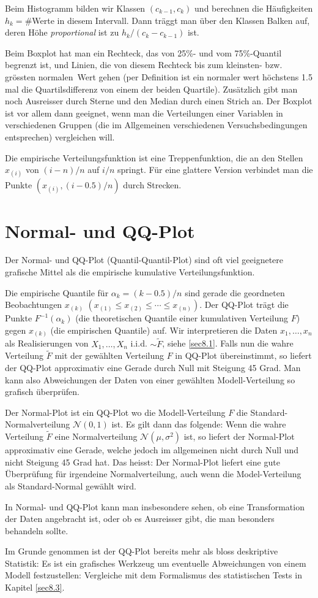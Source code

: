Beim Histogramm bilden wir Klassen $(c_{k-1},c_k)$ und berechnen die Häufigkeiten $h_k=$\#Werte in diesem Intervall. Dann träggt man über den Klassen Balken auf, deren Höhe \emph{proportional} ist zu $h_k/(c_k-c_{k-1})$ ist.

Beim Boxplot hat man ein Rechteck, das von 25\%- und vom 75\%-Quantil begrenzt ist, und Linien, die von diesem Rechteck bis zum kleinsten- bzw. grössten \glqq normalen\grqq\ Wert gehen (per Definition ist ein normaler wert höchstens 1.5 mal die Quartilsdifferenz von einem der beiden Quartile). Zusätzlich gibt man noch Ausreisser durch Sterne und den Median durch einen Strich an. Der Boxplot ist vor allem dann geeignet, wenn man die Verteilungen einer Variablen in verschiedenen Gruppen (die im Allgemeinen verschiedenen Versuchsbedingungen entsprechen) vergleichen will.

Die empirische Verteilungsfunktion ist eine Treppenfunktion, die an den Stellen $x_{(i)}$ von $(i-n)/n$ auf $i/n$ springt. Für eine glattere Version verbindet man die Punkte $(x_{(i)},(i-0.5)/n)$ durch Strecken.
\section{Normal- und QQ-Plot}
\label{sec7.3}
Der Normal- und QQ-Plot (\glqq Quantil-Quantil-Plot\grqq) sind oft viel geeignetere grafische Mittel als die empirische kumulative Verteilungsfunktion.

Die empirische Quantile für $\alpha_k=(k-0.5)/n$ sind gerade die geordneten Beobachtungen $x_{(k)}$ $(x_{(1)}\leq x_{(2)}\leq \cdots \leq x_{(n)})$. Der QQ-Plot trägt die Punkte $F^{-1}(\alpha_k)$ (die theoretischen Quantile einer kumulativen Verteilung $F$) gegen $x_{(k)}$ (die empirischen Quantile) auf. Wir interpretieren die Daten $x_1,\ldots,x_n$ als Realisierungen von $X_1,\ldots,X_n$ i.i.d. $\sim \tilde{F}$, siehe \ref{sec8.1}. Falls nun die wahre Verteilung $\tilde{F}$ mit der gewählten Verteilung $F$ in QQ-Plot übereinstimmt, so liefert der QQ-Plot approximativ eine Gerade durch Null mit Steigung 45 Grad. Man kann also Abweichungen der Daten von einer gewählten Modell-Verteilung so grafisch überprüfen.

Der Normal-Plot ist ein QQ-Plot wo die Modell-Verteilung $F$ die Standard-Normalverteilung $\mathcal{N}(0,1)$ ist. Es gilt dann das folgende: Wenn die wahre Verteilung $\tilde{F}$ eine Normalverteilung $\mathcal{N}(\mu,\sigma^2)$ ist, so liefert der Normal-Plot approximativ eine Gerade, welche jedoch im allgemeinen nicht durch Null und nicht Steigung 45 Grad hat. Das heisst: Der Normal-Plot liefert eine gute Überprüfung für irgendeine Normalverteilung, auch wenn die Model-Verteilung als Standard-Normal gewählt wird.

In Normal- und QQ-Plot kann man insbesondere sehen, ob eine Transformation der Daten angebracht ist, oder ob es Ausreisser gibt, die man besonders behandeln sollte.

Im Grunde genommen ist der QQ-Plot bereits mehr als bloss deskriptive Statistik: Es ist ein grafisches Werkzeug um eventuelle Abweichungen von einem Modell festzustellen: Vergleiche mit dem Formalismus des statistischen Tests in Kapitel \ref{sec8.3}.
